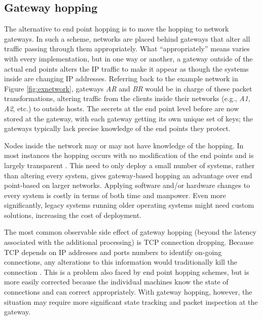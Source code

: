 \subsection{Gateway hopping}
\label{sec:gateway_hopping}
\par The alternative to end point hopping is to move the hopping to network gateways. In such a scheme, networks are placed behind gateways that alter all traffic passing through them appropriately. What ``appropriately'' means varies with every implementation, but in one way or another, a gateway outside of the actual end points alters the IP traffic to make it appear as though the systems inside are changing IP addresses. Referring back to the example network in Figure \ref{fig:exnetwork}, gateways \textit{AR} and \textit{BR} would be in charge of these packet transformations, altering traffic from the clients inside their networks (e.g., \textit{A1}, \textit{A2}, etc.) to outside hosts. The secrets at the end point level before are now stored at the gateway, with each gateway getting its own unique set of keys; the gateways typically lack precise knowledge of the end points they protect.

\par Nodes inside the network may or may not have knowledge of the hopping. In most instances the hopping occurs with no modification of the end points and is largely transparent \cite{TAO}. This need to only deploy a small number of systems, rather than altering every system, gives gateway-based hopping an advantage over end point-based on larger networks. Applying software and/or hardware changes to every system is costly in terms of both time and manpower. Even more significantly, legacy systems running older operating systems might need custom solutions, increasing the cost of deployment.

\par The most common observable side effect of gateway hopping (beyond the latency associated with the additional processing) is \ac{TCP} connection dropping. Because TCP depends on IP addresses and ports numbers to identify on-going connections, any alterations to this information would traditionally kill the connection \cite{NASR}. This is a problem also faced by end point hopping schemes, but is more easily corrected because the individual machines know the state of connections and can correct appropriately. With gateway hopping, however, the situation may require more significant state tracking and packet inspection at the gateway.

